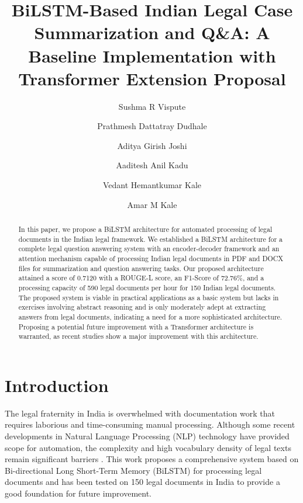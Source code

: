 \documentclass{llncs}
\begin{document}
\title{BiLSTM-Based Indian Legal Case Summarization and Q\&A: A Baseline Implementation with Transformer Extension Proposal}

\author{Sushma R Vispute \and
Prathmesh Dattatray Dudhale \and
Aditya Girish Joshi \and
Aaditesh Anil Kadu \and
Vedant Hemantkumar Kale\and
Amar M Kale}


\maketitle

\begin{abstract}
In this paper, we propose a BiLSTM architecture for automated processing of legal documents in the Indian legal framework. We established a BiLSTM architecture for a complete legal question answering system with an encoder-decoder framework and an attention mechanism capable of processing Indian legal documents in PDF and DOCX files for summarization and question answering tasks. Our proposed architecture attained a score of 0.7120 with a ROUGE-L score, an F1-Score of 72.76\%, and a processing capacity of 590 legal documents per hour for 150 Indian legal documents. The proposed system is viable in practical applications as a basic system but lacks in exercises involving abstract reasoning and is only moderately adept at extracting answers from legal documents, indicating a need for a more sophisticated architecture. Proposing a potential future improvement with a Transformer architecture is warranted, as recent studies show a major improvement with this architecture.

\end{abstract}

\section{Introduction}

The legal fraternity in India is overwhelmed with documentation work that requires laborious and time-consuming manual processing. Although some recent developments in Natural Language Processing (NLP) technology have provided scope for automation, the complexity and high vocabulary density of legal texts remain significant barriers \cite{akter2025legal}. This work proposes a comprehensive system based on Bi-directional Long Short-Term Memory (BiLSTM) for processing legal documents and has been tested on 150 legal documents in India to provide a good foundation for future improvement.
\end{document}
